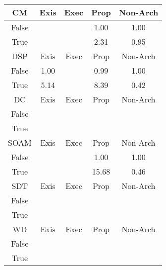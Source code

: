 \begin{tabular}{|c||c|c|c|c|}
\hline
CM & Exis & Exec & Prop & Non-Arch \\ 
\hline
False &  &  & \cellcolor[rgb]{0.9094435169088779,0.8373659800353556,0.4194806157816194} 1.00 & \cellcolor[rgb]{0.909997788342638,0.8399989523728285,0.42} 1.00 \\ 
\hline
True &  &  & \cellcolor[rgb]{0.8761614372581842,0.8239712071222977,0.42} 2.31 & \cellcolor[rgb]{0.8965794759973448,0.7764761863874313,0.40747417759752164} 0.95 \\ 
\hline
\hline
DSP & Exis & Exec & Prop & Non-Arch \\ 
\hline
False & \cellcolor[rgb]{0.9091208865918473,0.8358388632014105,0.4191794941523908} 1.00 &  & \cellcolor[rgb]{0.9084315463316853,0.832575985969977,0.4185361099095729} 0.99 & \cellcolor[rgb]{0.9099876721049119,0.8399941604707477,0.42} 1.00 \\ 
\hline
True & \cellcolor[rgb]{0.8028096864781443,0.7892256409633315,0.42} 5.14 &  & \cellcolor[rgb]{0.7187584162725364,0.7494118813922541,0.42} 8.39 & \cellcolor[rgb]{0.76,0.13,0.28} 0.42 \\ 
\hline
\hline
DC & Exis & Exec & Prop & Non-Arch \\ 
\hline
False &  &  &  &  \\ 
\hline
True &  &  &  &  \\ 
\hline
\hline
SOAM & Exis & Exec & Prop & Non-Arch \\ 
\hline
False &  &  & \cellcolor[rgb]{0.9095908322411725,0.838063272608217,0.4196181100917611} 1.00 & \cellcolor[rgb]{0.9099985004984356,0.8399992897097852,0.42} 1.00 \\ 
\hline
True &  &  & \cellcolor[rgb]{0.53,0.66,0.42} 15.68 & \cellcolor[rgb]{0.7710300803245639,0.18220904686960224,0.2902947416362596} 0.46 \\ 
\hline
\hline
SDT & Exis & Exec & Prop & Non-Arch \\ 
\hline
False &  &  &  &  \\ 
\hline
True &  &  &  &  \\ 
\hline
\hline
WD & Exis & Exec & Prop & Non-Arch \\ 
\hline
False &  &  &  &  \\ 
\hline
True &  &  &  &  \\ 
\hline
\end{tabular}
